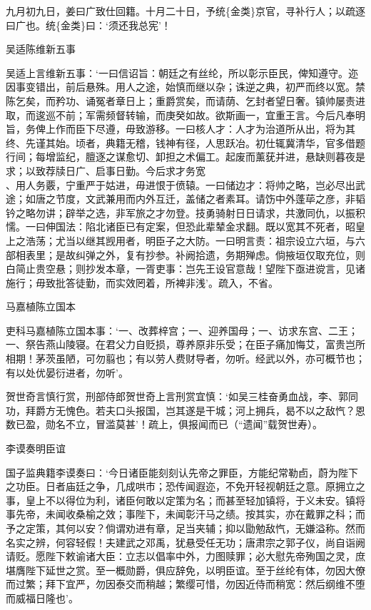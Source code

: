 \documentclass[]{article}
\begin{document}
九月初九日，姜曰广致仕回籍。十月二十日，予统\{金类\}京官，寻补行人；以疏逐曰广也。统\{金类\}曰：`须还我总宪'！

吴适陈维新五事

吴适上言维新五事：`一曰信诏旨：朝廷之有丝纶，所以彰示臣民，俾知遵守。迩因事变错出，前后悬殊。用人之途，始慎而继以杂；诛逆之典，初严而终以宽。禁陈乞矣，而矜功、诵冤者章日上；重爵赏矣，而请荫、乞封者望日奢。镇帅屡责进取，而逡巡不前；军需频督转输，而庚癸如故。欲斯画一，宜重王言。今后凡奉明旨，务俾上作而臣下尽遵，毋致游移。一曰核人才：人才为治道所从出，将为其终、先谨其始。顷者，典籍无稽，钱神有径，人思跃冶。初仕辄冀清华，官多借题行间；每增监纪，膻逐之谋愈切、卸担之术偏工。起废而薰莸并进，悬缺则暮夜是求；以致荐牍日广、启事日勤。今后求才务宽\\
、用人务覈，宁重严于姑进，毋进恨于偾辕。一曰储边才：将帅之略，岂必尽出武途；如唐之节度，文武兼用而内外互迁，盖储之者素耳。请饬中外蓬荜之彦，非韬钤之略勿讲；辟举之选，非军旅之才勿登。技勇骑射日日请求，共激同仇，以振积懦。一曰伸国法：陷北诸臣已有定案，但恐此辈辇金求翻。既以宽其不死者，昭皇上之浩荡；尤当以继其觊用者，明臣子之大防。一曰明言责：祖宗设立六垣，与六部相表里；是故纠弹之外，复有抄参。补阙拾遗，务期殚虑。倘掖垣仅取充位，则白简止贵空悬；则抄发本章，一胥吏事：岂先王设官意哉！望陛下亟进谠言，见诸施行；毋致批答徒勤，而实效罔着，所裨非浅'。疏入，不省。

马嘉植陈立国本

吏科马嘉植陈立国本事：`一、改葬梓宫；一、迎养国母；一、访求东宫、二王；一、祭告燕山陵寝。在君父力自贬损，尊养原非乐受；在臣子痛加悔艾，富贵岂所相期！茅茨虽陋，可勿翦也；有以劳人费财导者，勿听。经武以外，亦可概节也；有以处优晏衍进者，勿听'。

贺世奇言慎行赏，刑部侍郎贺世奇上言刑赏宜慎：`如吴三桂奋勇血战，李、郭同功，拜爵方无愧色。若夫口头报国，岂其遂是干城；河上拥兵，曷不以之敌忾？恩数已盈，勋名不立，冒滥莫甚'！疏上，俱报闻而已（``遗闻''载贺世寿）。

李谟奏明臣谊

国子监典籍李谟奏曰：`今日诸臣能刻刻认先帝之罪臣，方能纪常勒卣，蔚为陛下之功臣。日者庙廷之争，几成哄市；恐传闻遐迩，不免开轻视朝廷之意。原拥立之事，皇上不以得位为利，诸臣何敢以定策为名；而甚至轻加镇将，于义未安。镇将事先帝，未闻收桑榆之效；事陛下，未闻彰汗马之绩。按其实，亦在戴罪之科；而予之定策，其何以安？倘谓劝进有章，足当夹辅；抑以勖勉敌忾，无嫌溢称。然而名实之辨，何容轻假！夫建武之邓禹，犹悬受任无功；唐肃宗之郭子仪，尚自诣阙请贬。愿陛下敕谕诸大臣：立志以倡率中外，力图赎罪；必大慰先帝殉国之灵，庶堪膺陛下延世之赏。至一概勋爵，俱应辞免，以明臣谊。至于丝纶有体，勿因大僚而过繁；拜下宜严，勿因泰交而稍越；繁缨可惜，勿因近侍而稍宽：然后纲维不堕而威福日隆也'。
\end{document}
